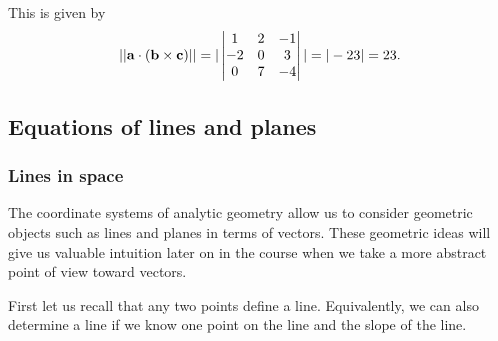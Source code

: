 \documentclass[12pt,letterpaper,reqno]{article}
\numberwithin{equation}{section}
\newcommand{\fixme}[1]{{\color{orange}{[#1]}}}
\begin{document}
{\color{red} 
This is given by
\begin{align*}
	||{\bf a} \cdot ({\bf b} \times {\bf c})||=\vert \begin{vmatrix}
		1 & 2 & -1 \\ -2 & 0 & 3 \\ 0 & 7 & -4
	\end{vmatrix} \vert = \vert -23 \vert = 23.
\end{align*}}

\subsection{Equations of lines and planes}
\subsubsection{Lines in space}
\fixme{Include here as well the point normal equation of a line. (See Anton page 144.) Show that the equation of a plane has a similar structure.}
The coordinate systems of analytic geometry allow us to consider geometric objects such as lines and planes in terms of vectors. These geometric ideas will give us valuable intuition later on in the course when we take a more abstract point of view toward vectors.

First let us recall that any two points define a line. Equivalently, we can also determine a line if we know one point on the line and the slope of the line. 
\end{document}
